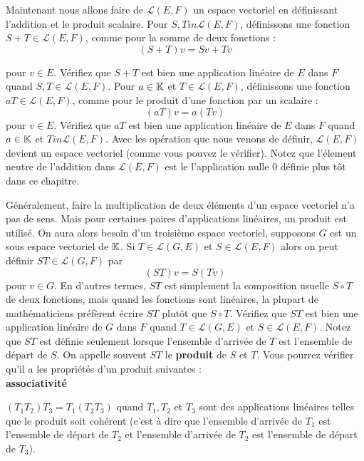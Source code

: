 \documentclass[12pt]{book}
\begin{document}
Maintenant nous allons faire de $\mathcal{L}(E,F)$ un espace vectoriel en définissant l'addition et le produit scalaire. Pour $S,T in \mathcal{L}(E,F)$, définissons une fonction $S + T \in  \mathcal{L}(E,F)$, comme pour la somme de deux fonctions :  
\begin{equation*}
    (S + T)v = Sv + Tv 
\end{equation*}

\noindent
pour $v \in E$. Vérifiez que $S + T$ est bien une application linéaire de $E$ dans $F$ quand $S,T \in \mathcal{L}(E,F)$. Pour $a \in \mathbb{K}$ et $T \in \mathcal{L}(E,F)$, définissons une fonction $aT \in \mathcal{L}(E,F)$, comme pour le produit d'une fonction par un scalaire :
\begin{equation*}
    (aT)v = a(Tv)
\end{equation*}
\noindent
pour $v \in E$. Vérifiez que $aT$ est bien une application linéaire de $E$ dans $F$ quand $a \in \mathbb{K}$ et $T in \mathcal{L}(E,F)$. Avec les opération que nous venons de définir, $\mathcal{L}(E,F)$ devient un espace vectoriel (comme vous pouvez le vérifier). Notez que l'élement neutre de l'addition dans $\mathcal{L}(E,F)$ est le l'application nulle $0$ définie plus tôt dans ce chapitre.

Généralement, faire la multiplication de deux éléments d'un espace vectoriel n'a pas de sens. Mais pour certaines paires d'applications linéaires, un produit est utilisé. On aura alors besoin d'un troisième espace vectoriel, supposons $G$ est un sous espace vectoriel de $\mathbb{K}$. Si $T \in \mathcal{L}(G,E)$ et $S \in \mathcal{L}(E,F)$ alors on peut définir $ST \in \mathcal{L}(G,F)$ par
\begin{equation*}
    (ST)v = S(Tv)
\end{equation*}
pour $v \in G$. En d'autres termes, $ST$ est simplement la composition usuelle $S\circ T$ de deux fonctions, mais quand les fonctions sont linéaires, la plupart de mathématiciens préfèrent écrire $ST$ plutôt que $S\circ T$. Vérifiez que $ST$ est bien une application linéaire de $G$ dans $F$ quand $T \in \mathcal{L}(G,E)$ et $S \in \mathcal{L}(E,F)$. Notez que $ST$ est définie seulement lorsque l'ensemble d'arrivée de $T$ est l'ensemble de départ de $S$. On appelle souvent $ST$ le \textbf{produit} de $S$ et $T$. Vous pourrez vérifier qu'il a les propriétés d'un produit suivantes :\\

\noindent
\textbf{associativité}
\begin{indpar}
$(T_1T_2)T_3=T_1(T_2T_3)$ quand $T_1,T_2$ et $T_3$ sont des applications linéaires telles que le produit soit cohérent (c'est à dire que l'ensemble d'arrivée de $T_1$ est l'ensemble de départ de $T_2$ et l'ensemble d'arrivée de $T_2$ est l'ensemble de départ de $T_3$). 
\end{indpar}
\end{document}
